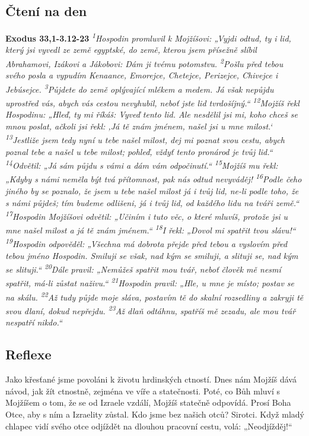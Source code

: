 \documentclass[11pt]{article}
\begin{document}
\subsection*{Čtení na den}
\textbf{Exodus 33,1-3.12-23}
\newline
\textit{
\textsuperscript{1}Hospodin promluvil k Mojžíšovi: „Vyjdi odtud, ty i lid, který jsi vyvedl ze země egyptské, do země, kterou jsem přísežně slíbil Abrahamovi, Izákovi a Jákobovi: Dám ji tvému potomstvu.
\textsuperscript{2}Pošlu před tebou svého posla a vypudím Kenaance, Emorejce, Chetejce, Perizejce, Chivejce i Jebúsejce.
\textsuperscript{3}Půjdete do země oplývající mlékem a medem. Já však nepůjdu uprostřed vás, abych vás cestou nevyhubil, neboť jste lid tvrdošíjný.“
\newline
\newline
\textsuperscript{12}Mojžíš řekl Hospodinu: „Hleď, ty mi říkáš: Vyveď tento lid. Ale nesdělil jsi mi, koho chceš se mnou poslat, ačkoli jsi řekl: ‚Já tě znám jménem, našel jsi u mne milost.‘
\textsuperscript{13}Jestliže jsem tedy nyní u tebe našel milost, dej mi poznat svou cestu, abych poznal tebe a našel u tebe milost; pohleď, vždyť tento pronárod je tvůj lid.“
\textsuperscript{14}Odvětil: „Já sám půjdu s vámi a dám vám odpočinutí.“
\textsuperscript{15}Mojžíš mu řekl: „Kdyby s námi neměla být tvá přítomnost, pak nás odtud nevyváděj!
\textsuperscript{16}Podle čeho jiného by se poznalo, že jsem u tebe našel milost já i tvůj lid, ne-li podle toho, že s námi půjdeš; tím budeme odlišeni, já i tvůj lid, od každého lidu na tváři země.“
\textsuperscript{17}Hospodin Mojžíšovi odvětil: „Učiním i tuto věc, o které mluvíš, protože jsi u mne našel milost a já tě znám jménem.“
\textsuperscript{18}I řekl: „Dovol mi spatřit tvou slávu!“
\textsuperscript{19}Hospodin odpověděl: „Všechna má dobrota přejde před tebou a vyslovím před tebou jméno Hospodin. Smiluji se však, nad kým se smiluji, a slituji se, nad kým se slituji.“
\textsuperscript{20}Dále pravil: „Nemůžeš spatřit mou tvář, neboť člověk mě nesmí spatřit, má-li zůstat naživu.“
\textsuperscript{21}Hospodin pravil: „Hle, u mne je místo; postav se na skálu.
\textsuperscript{22}Až tudy půjde moje sláva, postavím tě do skalní rozsedliny a zakryji tě svou dlaní, dokud nepřejdu.
\textsuperscript{23}Až dlaň odtáhnu, spatříš mě zezadu, ale mou tvář nespatří nikdo.“
}

\subsection*{Reflexe}
Jako křesťané jsme povoláni k životu hrdinských ctností. Dnes nám Mojžíš dává návod, jak žít ctnostně, zejména ve víře a
statečnosti. Poté, co Bůh mluví s Mojžíšem o tom, že se od Izraele vzdálí, Mojžíš statečně odpovídá. Prosí Boha Otce, aby s ním a
Izraelity zůstal.
Kdo jsme bez našich otců? Sirotci. Když mladý chlapec vidí svého otce odjíždět na dlouhou pracovní cestu, volá: „Neodjížděj!“
\end{document}
